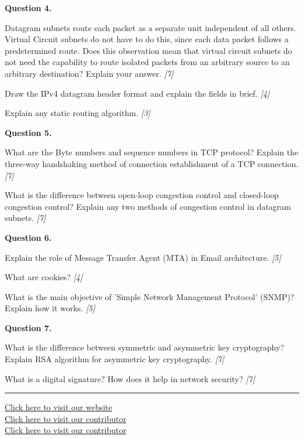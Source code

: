 \documentclass[11pt,a4paper]{article}
\newcommand{\pts}[1]{\hfill   \textit{[#1]}}
\begin{document}
\medskip


\noindent   \textbf{Question 4.}

\begin{parts}
  \item Datagram subnets route each packet as a separate unit independent of all others. Virtual Circuit subnets do not have to do this, since each data packet follows a predetermined route. Does this observation mean that virtual circuit subnets do not need the capability to route isolated packets from an arbitrary source to an arbitrary destination? Explain your answer. \pts{7}
  \item Draw the IPv4 datagram header format and explain the fields in brief. \pts{4}
  \item Explain any static routing algorithm. \pts{3}
\end{parts}

\medskip


\noindent   \textbf{Question 5.}

\begin{parts}
  \item What are the Byte numbers and sequence numbers in TCP protocol? Explain the three-way handshaking method of connection establishment of a TCP connection. \pts{7}
  \item What is the difference between open-loop congestion control and closed-loop congestion control? Explain any two methods of congestion control in datagram subnets. \pts{7}
\end{parts}

\medskip


\noindent   \textbf{Question 6.}

\begin{parts}
  \item Explain the role of Message Transfer Agent (MTA) in Email architecture. \pts{5}
  \item What are cookies? \pts{4}
  \item What is the main objective of 'Simple Network Management Protocol' (SNMP)? Explain how it works. \pts{5}
\end{parts}

\medskip


\noindent   \textbf{Question 7.}

\begin{parts}
  \item What is the difference between symmetric and asymmetric key cryptography? Explain RSA algorithm for asymmetric key cryptography. \pts{7}
  \item What is a digital signature? How does it help in network security? \pts{7}
\end{parts}

\vfill
\rule{\linewidth}{0.4pt}

\begin{center}\small
\href{https://bhu-exam.vercel.app/}{Click here to visit our website}\\[4pt]\href{https://me-aryan.vercel.app/}{Click here to visit our contributor}\\[4pt]\href{https://quashan-me.vercel.app/}{Click here to visit our contributor}
\end{center}
\end{document}
